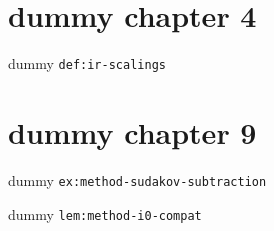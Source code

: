 \clearpage\begingroup\small
\setcounter{chapter}{4}\addtocounter{chapter}{-1}
\chapter{dummy chapter 4}
\begin{definition}\label{def:ir-scalings}dummy \texttt{def:ir-scalings}\end{definition}
\setcounter{chapter}{9}\addtocounter{chapter}{-1}
\chapter{dummy chapter 9}
\begin{example}\label{ex:method-sudakov-subtraction}dummy \texttt{ex:method-sudakov-subtraction}\end{example}
\begin{lemma}\label{lem:method-i0-compat}dummy \texttt{lem:method-i0-compat}\end{lemma}
\endgroup
